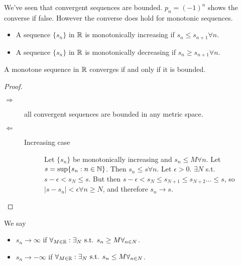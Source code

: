 We've seen that convergent sequences are bounded. $p_{n}=(-1)^{n}$ shows the converse if false.
However the converse does hold for monotonic sequences.
\begin{definition}[Monotone]
	\begin{itemize}
		\item
		      A sequence $\{s_n\}$ in $\mathbb{R}$ is monotonically increasing if $s_{n}\le s_{n+1} \forall n$.
		\item A sequence $\{s_n\}$ in $\mathbb{R}$ is monotonically decreasing if $s_{n}\ge s_{n+1} \forall n$.
	\end{itemize}
\end{definition}

\begin{thm}[14]
	A monotone sequence in $\mathbb{R}$ converges if and only if it is bounded.
	\begin{proof}
		\begin{description}
			\item[$\Rightarrow$] all convergent sequences are bounded in any metric space.
			\item [$\Leftarrow$]
			      \begin{description}
				      \item[Increasing case]
				            Let $\{s_n\}$ be monotonically increasing and $s_n \le M \forall n$.
				            Let $s=\sup \{ s_n:n \in \mathbb{N}\}$. Then $s_{n} \le s \forall n$. Let $\epsilon>0$. $\exists N $ s.t. $s-\epsilon<s_N\le s$.
				            But then $s-\epsilon<s_N\le s_{N+1}\le s_{N+2}\ldots \le s$, so $|s-s_n|<\epsilon \forall n\ge N$, and therefore $s_{n}\to s$.
			      \end{description}
		\end{description}
	\end{proof}
\end{thm}


\begin{definition}
	\label{def:3.15}
	We say
	\begin{itemize}
		\item
		      $s_{n}\to \infty $ if $\forall_{M \in \mathbb{R}}: \exists_{N} \text{ s.t. } s_n\ge M \forall_{n \in N}$.

		\item $s_{n}\to -\infty $ if $\forall_{M \in \mathbb{R}}: \exists_{N} \text{ s.t. } s_n\le M \forall_{n \in N}$.
	\end{itemize}
\end{definition}


